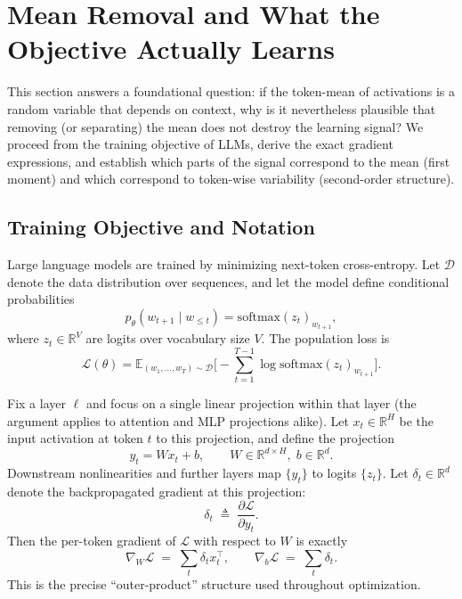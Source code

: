 \section{Mean Removal and What the Objective Actually Learns}
\label{sec:mean_removal_from_loss}

This section answers a foundational question: if the token-mean of activations is a random variable that depends on context, why is it nevertheless plausible that removing (or separating) the mean does not destroy the learning signal?
We proceed from the training objective of LLMs, derive the exact gradient expressions, and establish which parts of the signal correspond to the mean (first moment) and which correspond to token-wise variability (second-order structure).

\subsection{Training Objective and Notation}

Large language models are trained by minimizing next-token cross-entropy.
Let $\mathcal{D}$ denote the data distribution over sequences, and let the model define conditional probabilities
\begin{equation}
p_\theta(w_{t+1}\mid w_{\le t}) = \mathrm{softmax}(z_t)_ {w_{t+1}},
\end{equation}
where $z_t\in\mathbb{R}^V$ are logits over vocabulary size $V$.
The population loss is
\begin{equation}
\label{eq:ce_loss}
\mathcal{L}(\theta)=\mathbb{E}_{(w_1,\dots,w_T)\sim\mathcal{D}}\Bigg[-\sum_{t=1}^{T-1}\log \mathrm{softmax}(z_t)_{w_{t+1}}\Bigg].
\end{equation}

Fix a layer $\ell$ and focus on a single linear projection within that layer (the argument applies to attention and MLP projections alike).
Let $x_t\in\mathbb{R}^H$ be the input activation at token $t$ to this projection, and define the projection
\begin{equation}
\label{eq:linear_proj}
y_t = W x_t + b,\qquad W\in\mathbb{R}^{d\times H},\; b\in\mathbb{R}^d.
\end{equation}
Downstream nonlinearities and further layers map $\{y_t\}$ to logits $\{z_t\}$.
Let $\delta_t\in\mathbb{R}^d$ denote the backpropagated gradient at this projection:
\begin{equation}
\label{eq:delta_def}
\delta_t \;\triangleq\; \frac{\partial \mathcal{L}}{\partial y_t}.
\end{equation}
Then the per-token gradient of $\mathcal{L}$ with respect to $W$ is exactly
\begin{equation}
\label{eq:grad_outer}
\nabla_W \mathcal{L} \;=\; \sum_{t} \delta_t x_t^\top,
\qquad
\nabla_b \mathcal{L} \;=\; \sum_t \delta_t.
\end{equation}
This is the precise ``outer-product'' structure used throughout optimization.

